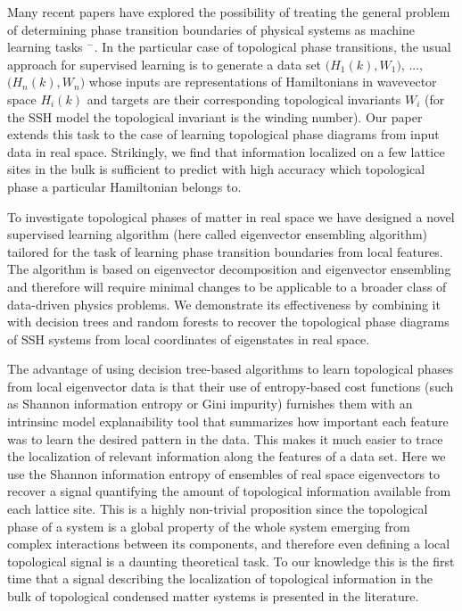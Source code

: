 \documentclass[fleqn,10pt]{wlscirep}
\begin{document}
Many recent papers have explored the possibility of treating the general problem of determining phase transition boundaries of physical systems as machine learning tasks \cite{carrasquilla2017machine}$^-$\cite{rodriguez2018identifying}. In the particular case of topological phase transitions, the usual approach for supervised learning is to generate a data set $\big(H_1(k), W_1\big)$, ..., $\big(H_n(k), W_n\big)$ whose inputs are representations of Hamiltonians in wavevector space $H_i(k)$ and targets are their corresponding topological invariants $W_i$ (for the SSH model the topological invariant is the winding number). Our paper extends this task to the case of learning topological phase diagrams from input data in real space. Strikingly, we find that information localized on a few lattice sites in the bulk is sufficient to predict with high accuracy which topological phase a particular Hamiltonian belongs to.

To investigate topological phases of matter in real space we have designed a novel supervised learning algorithm (here called eigenvector ensembling algorithm) tailored for the task of learning phase transition boundaries from local features. The algorithm is based on eigenvector decomposition and eigenvector ensembling and therefore will require minimal changes to be applicable to a broader class of data-driven physics problems. We demonstrate its effectiveness by combining it with decision trees and random forests to recover the topological phase diagrams of SSH systems from local coordinates of eigenstates in real space.

The advantage of using decision tree-based algorithms to learn topological phases from local eigenvector data is that their use of entropy-based cost functions (such as Shannon information entropy or Gini impurity) furnishes them with an intrinsinc model explanaibility tool that summarizes how important each feature was to learn the desired pattern in the data. This makes it much easier to trace the localization of relevant information along the features of a data set. Here we use the Shannon information entropy of ensembles of real space eigenvectors to recover a signal quantifying the amount of topological information available from each lattice site. This is a highly non-trivial proposition since the topological phase of a system is a global property of the whole system emerging from complex interactions between its components, and therefore even defining a local topological signal is a daunting theoretical task. To our knowledge this is the first time that a signal describing the localization of topological information in the bulk of topological condensed matter systems is presented in the literature.
\end{document}
